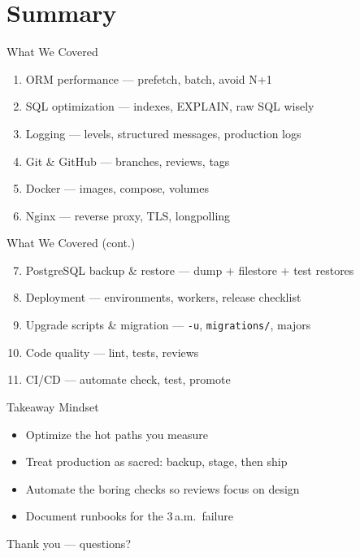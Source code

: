\section{Summary}

\begin{frame}{What We Covered}
\begin{enumerate}
  \item ORM performance --- prefetch, batch, avoid N+1
  \item SQL optimization --- indexes, EXPLAIN, raw SQL wisely
  \item Logging --- levels, structured messages, production logs
  \item Git \& GitHub --- branches, reviews, tags
  \item Docker --- images, compose, volumes
  \item Nginx --- reverse proxy, TLS, longpolling
\end{enumerate}
\end{frame}

\begin{frame}{What We Covered (cont.)}
\begin{enumerate}
  \setcounter{enumi}{6}
  \item PostgreSQL backup \& restore --- dump + filestore + test restores
  \item Deployment --- environments, workers, release checklist
  \item Upgrade scripts \& migration --- \texttt{-u}, \texttt{migrations/}, majors
  \item Code quality --- lint, tests, reviews
  \item CI/CD --- automate check, test, promote
\end{enumerate}
\end{frame}

\begin{frame}{Takeaway Mindset}
\begin{itemize}
  \item Optimize the hot paths you measure
  \item Treat production as sacred: backup, stage, then ship
  \item Automate the boring checks so reviews focus on design
  \item Document runbooks for the 3\,a.m.\ failure
\end{itemize}

\vspace{0.8em}
\begin{center}
\Large Thank you --- questions?
\end{center}
\end{frame}
